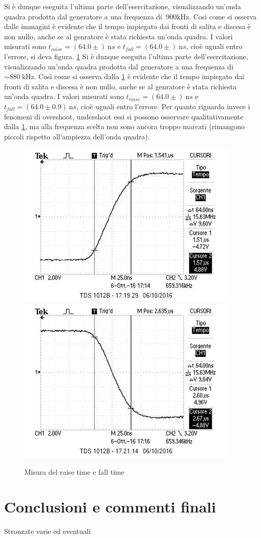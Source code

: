 \documentclass[10pt,a4paper]{article}
\begin{document}
Si è dunque eseguita l'ultima parte dell'esercitazione, visualizzando un'onda quadra prodotta dal generatore a una frequenza di $~900 \text{kHz}$.
Così come si osserva dalle immagini è evidente che il tempo impiegato dai fronti di salita e discesa è non nullo, anche se al genratore è stata richiesta un'onda quadra. I valori misurati sono $t_{raise} = (64.0 \pm )~\text{n}s$ e $t_{fall} = (64.0 \pm )~\text{n}s$, cioè uguali entro l'errore, si deva figura. \figurename{\ref{f:raise}}
Si è dunque eseguita l'ultima parte dell'esercitazione, visualizzando un'onda quadra prodotta dal generatore a una frequenza di $\sim880~\text{kHz}$.
Così come si osserva dalla \figurename{\ref{f:raise}} è evidente che il tempo impiegato dai fronti di salita e discesa è non nullo, anche se al genratore è stata richiesta un'onda quadra. I valori misurati sono $t_{raise} = (64.0 \pm )~\text{n}s$ e $t_{fall} = (64.0 \pm 0.9)~\text{n}s$, cioè uguali entro l'errore. %
Per quanto riguarda invece i fenomeni di overshoot, undershoot essi si possono osservare qualitativamente dalla \figurename{\ref{f:raise}}, ma alla frequenza scelta non sono ancora troppo marcati (rimangono piccoli rispetto all'ampiezza dell'onda quadra).

\begin{figure}[h]
	\centering
	\includegraphics[scale=0.6]{../Oscilloscopio/raise_time.jpg}
	\includegraphics[scale=0.6]{../Oscilloscopio/fall_time.jpg}
	\caption{Misura del raise time e fall time}
	\label{f:raise}
\end{figure}

\section{Conclusioni e commenti finali}
Stronzate varie ed eventuali
\end{document}
